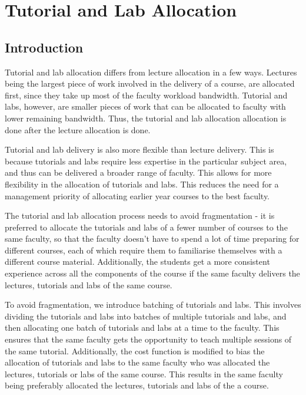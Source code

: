\chapter{Tutorial and Lab Allocation}

\section{Introduction}

Tutorial and lab allocation differs from lecture allocation in a few ways. Lectures being the largest piece of work involved in the delivery of a course, are allocated first, since they take up most of the faculty workload bandwidth. Tutorial and labs, however, are smaller pieces of work that can be allocated to faculty with lower remaining bandwidth. Thus, the tutorial and lab allocation allocation is done after the lecture allocation is done.

Tutorial and lab delivery is also more flexible than lecture delivery. This is because tutorials and labs require less expertise in the particular subject area, and thus can be delivered a broader range of faculty. This allows for more flexibility in the allocation of tutorials and labs. This reduces the need for a management priority of allocating earlier year courses to the best faculty.

The tutorial and lab allocation process needs to avoid fragmentation - it is preferred to allocate the tutorials and labs of a fewer number of courses to the same faculty, so that the faculty doesn't have to spend a lot of time preparing for different courses, each of which require them to familiarise themselves with a different course material. Additionally, the students get a more consistent experience across all the components of the course if the same faculty delivers the lectures, tutorials and labs of the same course.

To avoid fragmentation, we introduce batching of tutorials and labs. This involves dividing the tutorials and labs into batches of multiple tutorials and labs, and then allocating one batch of tutorials and labs at a time to the faculty. This ensures that the same faculty gets the opportunity to teach multiple sessions of the same tutorial. Additionally, the cost function is modified to bias the allocation of tutorials and labs to the same faculty who was allocated the lectures, tutorials or labs of the same course. This results in the same faculty being preferably allocated the lectures, tutorials and labs of the a course.


